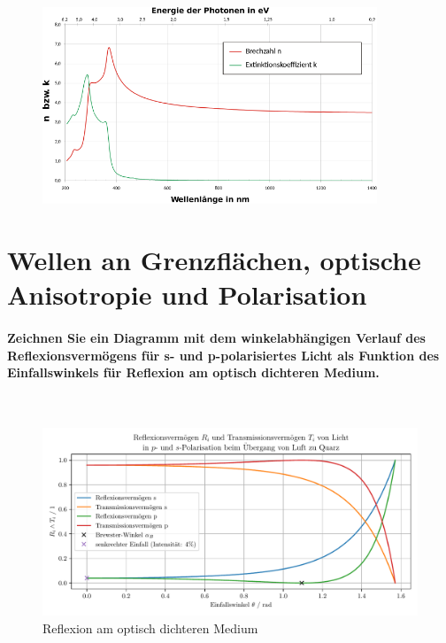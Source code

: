 \documentclass[a4paper, 11pt, ngerman, parskip=half-]{scrartcl}
\newcommand{\myparagraph}[1]{\paragraph{#1}\mbox{}\\}
\begin{document}
\begin{figure}[H]
    \centering
    \includegraphics[width=10cm]{image/14/6}
\end{figure}

\newpage

\section{Wellen an Grenzflächen, optische Anisotropie und Polarisation}
\label{Wellen an Grenzflaechen, optische Anisotropie und Polarisation}
%
\myparagraph{Zeichnen Sie ein Diagramm mit dem winkelabhängigen Verlauf des Reflexionsvermögens für s- und p-polarisiertes Licht als Funktion des Einfallswinkels für Reflexion am optisch dichteren Medium.}
%
\begin{figure}[H]
    \centering
    \begin{samepage}
        \includegraphics[width=\textwidth]{image/15/Luft_zu_Quarz.pdf}
        \caption{Reflexion am optisch dichteren Medium}
        \label{fig:reflexion_dicht}
    \end{samepage}
\end{figure}
\end{document}
